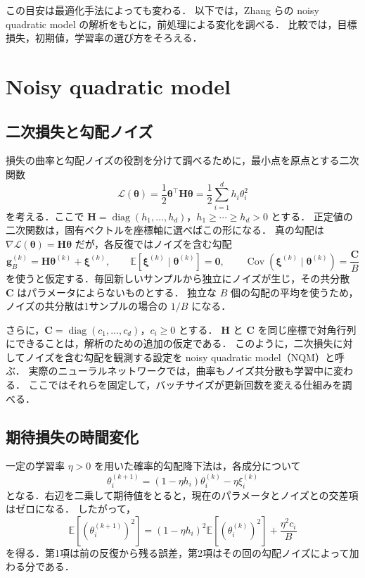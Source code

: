 \documentclass[../main.tex]{subfiles}
\begin{document}
この目安は最適化手法によっても変わる．
以下では，Zhang らの noisy quadratic model の解析をもとに，前処理による変化を調べる\cite{zhang2019nqm}．
比較では，目標損失，初期値，学習率の選び方をそろえる．

\section{Noisy quadratic model}
\label{sec:noisy-quadratic-model}

\subsection{二次損失と勾配ノイズ}

損失の曲率と勾配ノイズの役割を分けて調べるために，最小点を原点とする二次関数
\begin{equation}
  \mathcal{L}(\bm{\theta})=\frac12\bm{\theta}^\top \bm{H}\bm{\theta}
  =\frac12\sum_{i=1}^d h_i \theta_i^2
  \label{eq:nqm-loss}
\end{equation}
を考える．ここで $\bm{H}=\operatorname{diag}(h_1,\ldots,h_d)$，$h_1\geq\cdots\geq h_d>0$ とする．
正定値の二次関数は，固有ベクトルを座標軸に選べばこの形になる．
真の勾配は $\nabla \mathcal{L}(\bm{\theta})=\bm{H}\bm{\theta}$ だが，各反復ではノイズを含む勾配
\begin{equation}
  \bm{g}_B^{(k)}=\bm{H}\bm{\theta}^{(k)}+\bm{\xi}^{(k)},
  \qquad
  \mathbb{E}[\bm{\xi}^{(k)}\mid\bm{\theta}^{(k)}]=\bm{0},
  \qquad
  \operatorname{Cov}(\bm{\xi}^{(k)}\mid\bm{\theta}^{(k)})=\frac{\bm{C}}{B}
  \label{eq:nqm-gradient}
\end{equation}
を使うと仮定する．毎回新しいサンプルから独立にノイズが生じ，その共分散 $\bm{C}$ はパラメータによらないものとする．
独立な $B$ 個の勾配の平均を使うため，ノイズの共分散は1サンプルの場合の $1/B$ になる．

さらに，$\bm{C}=\operatorname{diag}(c_1,\ldots,c_d)$，$c_i\geq0$ とする．
$\bm{H}$ と $\bm{C}$ を同じ座標で対角行列にできることは，解析のための追加の仮定である．
このように，二次損失に対してノイズを含む勾配を観測する設定を noisy quadratic model（NQM）と呼ぶ．
実際のニューラルネットワークでは，曲率もノイズ共分散も学習中に変わる．
ここではそれらを固定して，バッチサイズが更新回数を変える仕組みを調べる．

\subsection{期待損失の時間変化}

一定の学習率 $\eta>0$ を用いた確率的勾配降下法は，各成分について
\begin{equation}
  \theta_i^{(k+1)}=(1-\eta h_i)\theta_i^{(k)}-\eta\xi_i^{(k)}
  \label{eq:nqm-sgd}
\end{equation}
となる．右辺を二乗して期待値をとると，現在のパラメータとノイズとの交差項はゼロになる．
したがって，
\begin{equation}
  \mathbb{E}[(\theta_i^{(k+1)})^2]
  =(1-\eta h_i)^2\mathbb{E}[(\theta_i^{(k)})^2]
  +\frac{\eta^2c_i}{B}
  \label{eq:nqm-second-moment}
\end{equation}
を得る．第1項は前の反復から残る誤差，第2項はその回の勾配ノイズによって加わる分である．
\end{document}
